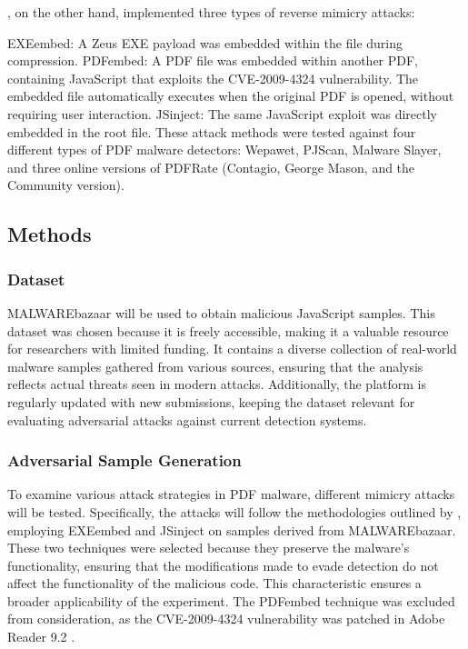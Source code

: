 \documentclass[10pt,twocolumn]{article}
\begin{document}
\textcite{Maiorca2013}, on the other hand, implemented three types of reverse mimicry attacks:

EXEembed: A Zeus EXE payload was embedded within the file during compression.
PDFembed: A PDF file was embedded within another PDF, containing JavaScript that exploits the CVE-2009-4324 vulnerability. The embedded file automatically executes when the original PDF is opened, without requiring user interaction.
JSinject: The same JavaScript exploit was directly embedded in the root file.
These attack methods were tested against four different types of PDF malware detectors: Wepawet, PJScan, Malware Slayer, and three online versions of PDFRate (Contagio, George Mason, and the Community version).








\subsection{Methods}

\subsubsection{Dataset}
MALWAREbazaar \cite{MalwareBazaar} will be used to obtain malicious JavaScript samples. This dataset was chosen because it is freely accessible, making it a valuable resource for researchers with limited funding. It contains a diverse collection of real-world malware samples gathered from various sources, ensuring that the analysis reflects actual threats seen in modern attacks. Additionally, the platform is regularly updated with new submissions, keeping the dataset relevant for evaluating adversarial attacks against current detection systems.

\subsubsection{Adversarial Sample Generation}

To examine various attack strategies in PDF malware, different mimicry attacks will be tested. Specifically, the attacks will follow the methodologies outlined by \textcite{Maiorca2013}, employing EXEembed and JSinject on samples derived from MALWAREbazaar. These two techniques were selected because they preserve the malware’s functionality, ensuring that the modifications made to evade detection do not affect the functionality of the malicious code. This characteristic ensures a broader applicability of the experiment. The PDFembed technique was excluded from consideration, as the CVE-2009-4324 vulnerability was patched in Adobe Reader 9.2 \cite{TREND}.
\end{document}
